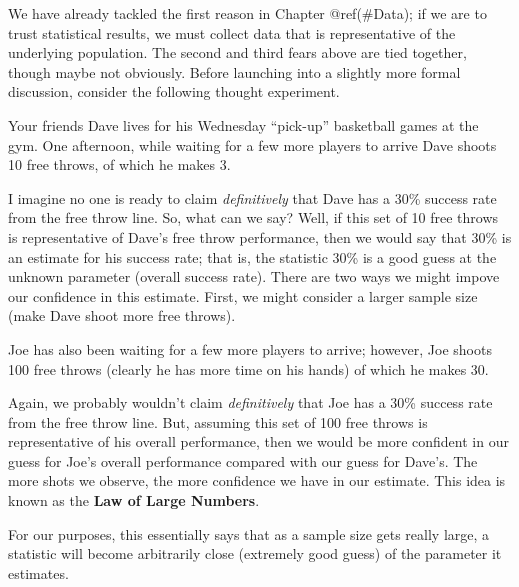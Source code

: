 \documentclass[]{book}
\theoremstyle{definition}
\theoremstyle{definition}
\theoremstyle{remark}
\let\BeginKnitrBlock\begin \let\EndKnitrBlock\end
\begin{document}
We have already tackled the first reason in Chapter @ref(\#Data); if we
are to trust statistical results, we must collect data that is
representative of the underlying population. The second and third fears
above are tied together, though maybe not obviously. Before launching
into a slightly more formal discussion, consider the following thought
experiment.

\BeginKnitrBlock{example}[Free Throws]
\protect\hypertarget{ex:samplingdistns-free-throws}{}{\label{ex:samplingdistns-free-throws}
{} }Your friends Dave lives for his Wednesday
``pick-up'' basketball games at the gym. One afternoon, while waiting
for a few more players to arrive Dave shoots 10 free throws, of which he
makes 3.
\EndKnitrBlock{example}

I imagine no one is ready to claim \emph{definitively} that Dave has a
30\% success rate from the free throw line. So, what can we say? Well,
if this set of 10 free throws is representative of Dave's free throw
performance, then we would say that 30\% is an estimate for his success
rate; that is, the statistic 30\% is a good guess at the unknown
parameter (overall success rate). There are two ways we might impove our
confidence in this estimate. First, we might consider a larger sample
size (make Dave shoot more free throws).

\BeginKnitrBlock{example}[Free Throws (cont.)]
\protect\hypertarget{ex:samplingdistns-free-throws2}{}{\label{ex:samplingdistns-free-throws2}
{} }Joe has also been waiting for a
few more players to arrive; however, Joe shoots 100 free throws (clearly
he has more time on his hands) of which he makes 30.
\EndKnitrBlock{example}

Again, we probably wouldn't claim \emph{definitively} that Joe has a
30\% success rate from the free throw line. But, assuming this set of
100 free throws is representative of his overall performance, then we
would be more confident in our guess for Joe's overall performance
compared with our guess for Dave's. The more shots we observe, the more
confidence we have in our estimate. This idea is known as the
\textbf{Law of Large Numbers}.

\BeginKnitrBlock{definition}[Law of Large Numbers]
\protect\hypertarget{def:defn-lln}{}{\label{def:defn-lln} {} }For our purposes, this essentially says that as a
sample size gets really large, a statistic will become arbitrarily close
(extremely good guess) of the parameter it estimates.
\EndKnitrBlock{definition}
\end{document}
